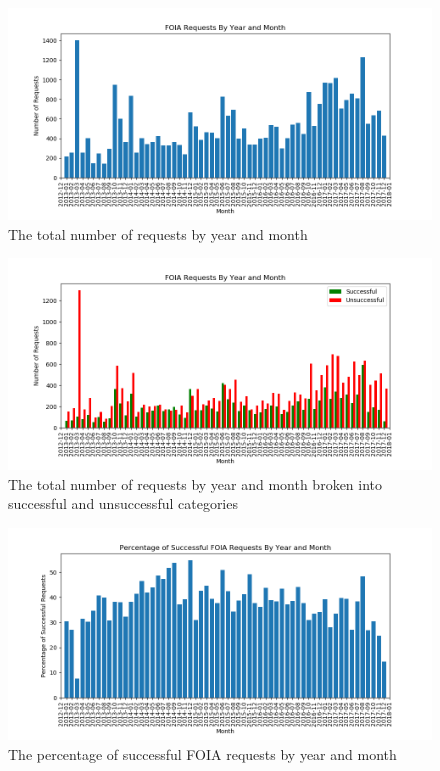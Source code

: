 \documentclass{article}
\begin{document}
		\begin{figure}[H]
			\centering
			\includegraphics[width=1\textwidth]{monthly_total}
			\caption{The total number of requests by year and month}
			\label{fig:monthly_total}
		\end{figure}
	
		\begin{figure}[H]
			\centering
			\includegraphics[width=1\textwidth]{monthly_breakdown}
			\caption{The total number of requests by year and month broken into successful and unsuccessful categories}
			\label{fig:monthly_breakdown}
		\end{figure}
	
		\begin{figure}[H]
			\centering
			\includegraphics[width=1\textwidth]{monthly_percent_successful}
			\caption{The percentage of successful FOIA requests by year and month}
			\label{fig:monthly_percent_successful}
		\end{figure}
	
\end{document}
